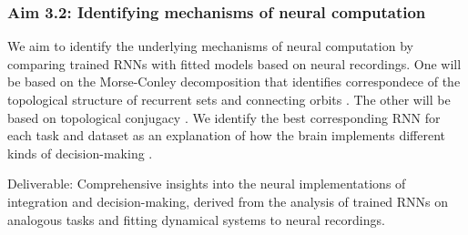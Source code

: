 \documentclass[12pt,letterpaper, onecolumn]{article}
\theoremstyle{definition}
\theoremstyle{remark}
\begin{document}
\subsubsection*{Aim 3.2: Identifying mechanisms of neural computation}
We aim to identify the underlying mechanisms of neural computation by comparing trained RNNs with fitted models based on neural recordings.  One will be based on the Morse-Conley decomposition that identifies correspondece of the topological structure of recurrent sets and connecting orbits \citep{arai2009database, kaczynski2004computational}. The other will be based on topological conjugacy \citep{ostrow2024beyond}.
We identify the best corresponding RNN for each task and dataset as an explanation of how the brain implements different kinds of decision-making \citep{levenstein2023}.
 


Deliverable:  Comprehensive insights into the neural implementations of integration and decision-making, derived from the analysis of trained RNNs on analogous tasks and fitting dynamical systems to neural recordings.

\newpage
\printbibliography
\end{document}

